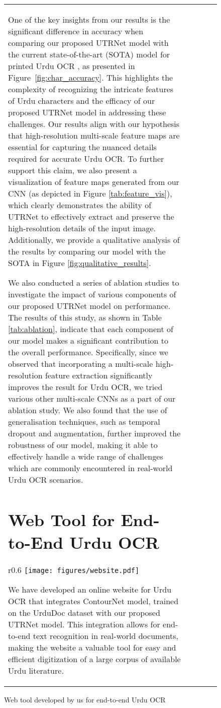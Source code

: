 \documentclass[runningheads]{llncs}
\newcommand{\ModelName}{{UTRNet}\xspace}
\newcommand{\DetectionDataset}{{UrduDoc}\xspace}
\begin{document}
\begin{figure}[t]
\begin{tabular}{lcccc}
One of the key insights from our results is the significant difference in accuracy when comparing our proposed \ModelName model with the current state-of-the-art (SOTA) model for printed Urdu OCR \cite{iiith17urdu}, as presented in Figure~\ref{fig:char_accuracy}. This highlights the complexity of recognizing the intricate features of Urdu characters and the efficacy of our proposed \ModelName model in addressing these challenges. Our results align with our hypothesis that high-resolution multi-scale feature maps are essential for capturing the nuanced details required for accurate Urdu OCR. To further support this claim, we also present a visualization of feature maps generated from our CNN (as depicted in Figure \ref{tab:feature_vis}), which clearly demonstrates the ability of \ModelName to effectively extract and preserve the high-resolution details of the input image. Additionally, we provide a qualitative analysis of the results by comparing our model with the SOTA \cite{iiith17urdu} in Figure \ref{fig:qualitative_results}.

We also conducted a series of ablation studies to investigate the impact of various components of our proposed \ModelName model on performance. The results of this study, as shown in Table \ref{tab:ablation}, indicate that each component of our model makes a significant contribution to the overall performance. Specifically, since we observed that incorporating a multi-scale high-resolution feature extraction significantly improves the result for Urdu OCR, we tried various other multi-scale CNNs as a part of our ablation study. We also found that the use of generalisation techniques, such as temporal dropout and augmentation, further improved the robustness of our model, making it able to effectively handle a wide range of challenges which are commonly encountered in real-world Urdu OCR scenarios. 
\section{Web Tool for End-to-End Urdu OCR}
\label{section:webtool}


\begin{wrapfigure}{r}{0.6\linewidth}
	\setlength{\columnsep}{0pt}\centering
	\vspace{-2.5em}
	\texttt{[image: figures/website.pdf]}
	\vspace{-1.8em}
	\caption{Web tool developed by us for end-to-end Urdu OCR}
\end{wrapfigure}
We have developed an online website for Urdu OCR that integrates ContourNet \cite{contournet_orig} model, trained on the {\DetectionDataset} dataset with our proposed \ModelName model. This integration allows for end-to-end text recognition in real-world documents, making the website a valuable tool for easy and efficient digitization of a large corpus of available Urdu literature. 


\end{tabular}
\end{figure}
\end{document}
